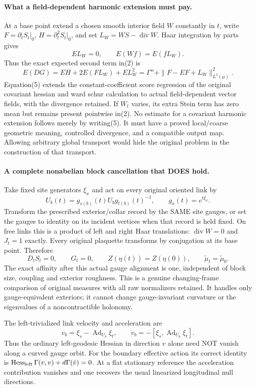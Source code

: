 \documentclass[11pt]{article}
\begin{document}
\paragraph{What a field-dependent harmonic extension must pay.}
At a base point extend a chosen smooth interior field $W$ constantly in $t$,
write $F=\partial_tS_t|_0$, $H=\partial_t^2S_t|_0$, and set
$L_W=WS-\operatorname{div}W$. Haar integration by parts gives
\[
 E L_W=0,\qquad E(Wf)=E(fL_W).
\]
Thus the exact expected second term in(2) is
\[
 E(DG)=E H+2E(F L_W)+E L_W^2
      =\Gamma''+\|F-EF+L_W\|_{L^2(\mu)}^2.                            \tag{5}
\]
Equation(5) extends the constant-coefficient score regression of the original covariant hessian and ward schur calculation to
actual field-dependent vector fields, with the divergence retained. If $W_t$
varies, its extra Stein term has zero mean but remains present pointwise in(2).
No estimate for a covariant harmonic extension follows merely by writing(5).
It must have a proved local/coarse geometric meaning, controlled divergence,
and a compatible output map. Allowing arbitrary global transport would hide
the original problem in the construction of that transport.

\paragraph{A complete nonabelian block cancellation that DOES hold.}
Take fixed site generators $\xi_x$ and act on every original oriented link by
\[
 U_b(t)=g_{s(b)}(t)U_bg_{t(b)}(t)^{-1},\qquad g_x(t)=e^{t\xi_x}.
\]
Transform the prescribed exterior/collar record by the SAME site gauges, or
set the gauges to identity on its incident vertices when that record is held
fixed. On free links this is a product of left and right Haar translations:
$\operatorname{div}W=0$ and $J_t=1$ exactly. Every original plaquette transforms
by conjugation at its base point. Therefore
\[
 D_tS_t=0,\qquad G_t=0,\qquad Z(\eta(t))=Z(\eta(0)),\qquad
 \widetilde\mu_t=\widetilde\mu_0.                                      \tag{6}
\]
The exact affinity after this actual gauge alignment is one, independent of
block size, coupling and exterior roughness. This is a genuine changing-frame
comparison of original measures with all raw normalizers retained. It handles
only gauge-equivalent exteriors; it cannot change gauge-invariant curvature
or the eigenvalues of a noncontractible holonomy.

The left-trivialized link velocity and acceleration are
\[
 v_b=\xi_s-\operatorname{Ad}_{U_b}\xi_t,\qquad
 \dot v_b=-[\xi_s,\operatorname{Ad}_{U_b}\xi_t].                         \tag{7}
\]
Thus the ordinary left-geodesic Hessian in direction $v$ alone need NOT vanish
along a curved gauge orbit. For the boundary effective action its correct
identity is $\operatorname{Hess}_{\rm left}\Gamma(v,v)+d\Gamma(\dot v)=0$.
At a flat stationary reference the acceleration contribution vanishes and
one recovers the usual linearized longitudinal null directions.
\end{document}
